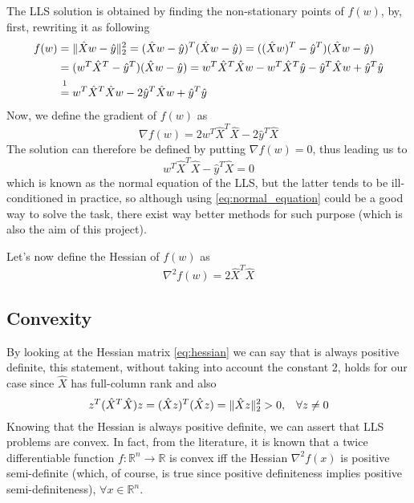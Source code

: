 \noindent The LLS solution is obtained by finding the non-stationary points of $f(w)$, by, first, rewriting it as following
\begin{equation}
\begin{aligned}
    f(w)&=\lVert \hat{X}w-\hat{y} \rVert_2^2 =(\hat{X}w-\hat{y})^T(\hat{X}w-\hat{y}) = ((\hat{X}w)^T-\hat{y}^T)(\hat{X}w-\hat{y})\\
    &=(w^T\hat{X}^T-\hat{y}^T)(\hat{X}w-\hat{y})=w^T\hat{X}^T\hat{X}w-w^T\hat{X}^T\hat{y}-\hat{y}^T\hat{X}w+\hat{y}^T\hat{y}\\
    &\stackrel{\footnotemark}{=} w^T\hat{X}^T\hat{X}w-2\hat{y}^T\hat{X}w+\hat{y}^T\hat{y}
\end{aligned}
\end{equation}
\noindent Now, we define the gradient of $f(w)$ as
\begin{equation}
    \nabla f(w) = 2w^T\hat{X}^T\hat{X} - 2\hat{y}^T \hat{X}
\label{eq:gradient}
\end{equation}
The solution can therefore be defined by putting $\nabla f(w)=0$, thus leading us to
\begin{equation}
    w^T\hat{X}^T\hat{X} - \hat{y}^T \hat{X}=0
    \label{eq:normal_equation}
\end{equation}
which is known as the normal equation of the LLS, but the latter tends to be ill-conditioned in practice, so although using \eqref{eq:normal_equation} could be a good way to solve the task, there exist way better methods for such purpose (which is also the aim of this project).
\vspace{3mm}

\noindent Let's now define the Hessian of $f(w)$ as
\begin{equation}
    \nabla^2 f(w) = 2 \hat{X}^T \hat{X}
    \label{eq:hessian}
\end{equation}

\subsection{Convexity}\label{subsec:introduction_convexity}
By looking at the Hessian matrix \eqref{eq:hessian} we can say that is always positive definite, this statement, without taking into account the constant 2, holds for our case since $\hat{X}$ has full-column rank and also
\begin{equation}
    z^T(\hat{X}^T \hat{X}) z = (\hat{X} z)^T(\hat{X} z) = \lVert \hat{X} z \rVert_2^2>0, \hspace{3mm} \forall z \neq 0
    \label{eq:p_definite}
\end{equation}
Knowing that the Hessian is always positive definite, we can assert that LLS problems are convex. In fact, from the literature, it is known that a twice differentiable function $f: \mathbb{R}^n \xrightarrow{} \mathbb{R}$ is convex iff the Hessian $\nabla^2 f(x)$ is positive semi-definite (which, of course, is true since positive definiteness implies positive semi-definiteness), $\forall x \in \mathbb{R}^n$.
